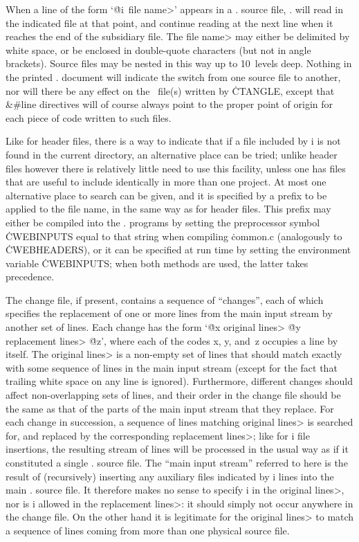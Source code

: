 When a line of the form `\.{@i}~\<file name>' appears in a \CWEB. source
file, \CWEB. will read in the indicated file at that point, and continue
reading at the next line when it reaches the end of the subsidiary file. The
\<file name> may either be delimited by white space, or be enclosed in
double-quote characters (but not in angle brackets). Source files may be
nested in this way up to 10~levels deep. Nothing in the printed \CWEB.
document will indicate the switch from one source file to another, nor will
there be any effect on the \Cee~file(s) written by \.{CTANGLE}, except that
\&{\#line} directives will of course always point to the proper point of
origin for each piece of code written to such files.

Like for header files, there is a way to indicate that if a file included by
\:i is not found in the current directory, an alternative place can be
tried; unlike header files however there is relatively little need to use
this facility, unless one has files that are useful to include identically
in more than one project. At most one alternative place to search can be
given, and it is specified by a prefix to be applied to the file name, in
the same way as for header files. This prefix may either be compiled into
the \CWEB. programs by setting the preprocessor symbol \.{CWEBINPUTS} equal
to that string when compiling \.{common.c} (analogously to \.{CWEBHEADERS}),
or it can be specified at run time by setting the environment variable
\.{CWEBINPUTS}; when both methods are used, the latter takes precedence.

The change file, if present, contains a sequence of ``changes'', each of
which specifies the replacement of one or more lines from the main input
stream by another set of lines. Each change has the form `\.{@x} \<original
lines> \.{@y} \<replacement lines> \.{@z}', where each of the codes \:x,
\:y, and~\:z occupies a line by itself. The \<original lines> is a non-empty
set of lines that should match exactly with some sequence of lines in the
main input stream (except for the fact that trailing white space on any line
is ignored). Furthermore, different changes should affect non-overlapping
sets of lines, and their order in the change file should be the same as that
of the parts of the main input stream that they replace. For each change in
succession, a sequence of lines matching \<original lines> is searched for,
and replaced by the corresponding \<replacement lines>; like for \:i file
insertions, the resulting stream of lines will be processed in the usual way
as if it constituted a single \CWEB. source file. The ``main input stream''
referred to here is the result of (recursively) inserting any auxiliary
files indicated by \:i lines into the main \CWEB. source file. It therefore
makes no sense to specify \:i in the \<original lines>, nor is \:i allowed
in the \<replacement lines>: it should simply not occur anywhere in the
change file. On the other hand it is legitimate for the \<original lines> to
match a sequence of lines coming from more than one physical source file.

